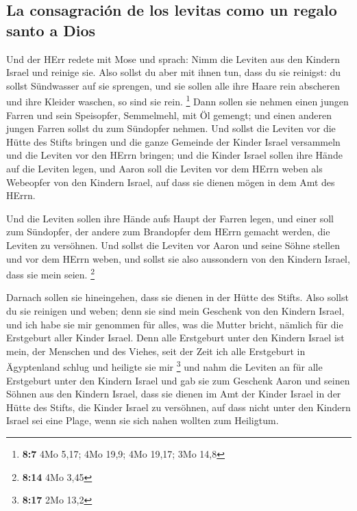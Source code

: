 \hypertarget{la-consagraciuxf3n-de-los-levitas-como-un-regalo-santo-a-dios}{%
\subsection{La consagración de los levitas como un regalo santo a
Dios}\label{la-consagraciuxf3n-de-los-levitas-como-un-regalo-santo-a-dios}}

 Und der HErr redete mit Mose und sprach: 
Nimm die Leviten aus den Kindern Israel und reinige sie. 
Also sollst du aber mit ihnen tun, dass du sie reinigst: du sollst
Sündwasser auf sie sprengen, und sie sollen alle ihre Haare rein
abscheren und ihre Kleider waschen, so sind sie rein. \footnote{\textbf{8:7}
  4Mo 5,17; 4Mo 19,9; 4Mo 19,17; 3Mo 14,8}  Dann sollen
sie nehmen einen jungen Farren und sein Speisopfer, Semmelmehl, mit Öl
gemengt; und einen anderen jungen Farren sollst du zum Sündopfer nehmen.
 Und sollst die Leviten vor die Hütte des Stifts bringen
und die ganze Gemeinde der Kinder Israel versammeln  und
die Leviten vor den HErrn bringen; und die Kinder Israel sollen ihre
Hände auf die Leviten legen,  und Aaron soll die Leviten
vor dem HErrn weben als Webeopfer von den Kindern Israel, auf dass sie
dienen mögen in dem Amt des HErrn.

 Und die Leviten sollen ihre Hände aufs Haupt der Farren
legen, und einer soll zum Sündopfer, der andere zum Brandopfer dem HErrn
gemacht werden, die Leviten zu versöhnen.  Und sollst die
Leviten vor Aaron und seine Söhne stellen und vor dem HErrn weben,
 und sollst sie also aussondern von den Kindern Israel,
dass sie mein seien. \footnote{\textbf{8:14} 4Mo 3,45}

 Darnach sollen sie hineingehen, dass sie dienen in der
Hütte des Stifts. Also sollst du sie reinigen und weben; 
denn sie sind mein Geschenk von den Kindern Israel, und ich habe sie mir
genommen für alles, was die Mutter bricht, nämlich für die Erstgeburt
aller Kinder Israel.  Denn alle Erstgeburt unter den
Kindern Israel ist mein, der Menschen und des Viehes, seit der Zeit ich
alle Erstgeburt in Ägyptenland schlug und heiligte sie mir \footnote{\textbf{8:17}
  2Mo 13,2}  und nahm die Leviten an für alle Erstgeburt
unter den Kindern Israel  und gab sie zum Geschenk Aaron
und seinen Söhnen aus den Kindern Israel, dass sie dienen im Amt der
Kinder Israel in der Hütte des Stifts, die Kinder Israel zu versöhnen,
auf dass nicht unter den Kindern Israel sei eine Plage, wenn sie sich
nahen wollten zum Heiligtum.

